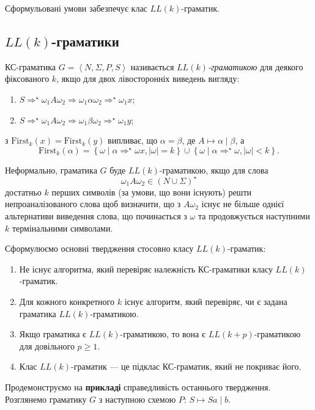 Сформульовані умови забезпечує клас $LL(k)$-граматик.

\subsection{\texorpdfstring{$LL(k)$}{LLk}-граматики}

КС-граматика $G = \left\langle N, \Sigma, P, S \right\rangle$ називається \textit{$LL(k)$-граматикою} для деякого фіксованого $k$, якщо для двох лівосторонніх виведень вигляду:
\begin{enumerate}
	\item $S \Rightarrow^\star \omega_1 A \omega_2 \Rightarrow \omega_1 \alpha \omega_2 \Rightarrow^\star \omega_1 x$;
	\item $S \Rightarrow^\star \omega_1 A \omega_2 \Rightarrow \omega_1 \beta \omega_2 \Rightarrow^\star \omega_1 y$;
\end{enumerate}
з $\text{First}_k (x) = \text{First}_k (y)$ випливає, що $\alpha = \beta$, де $A \mapsto \alpha \mid \beta$, а \[\text{First}_k(\alpha) = \left\{ \omega \mid \alpha \Rightarrow^\star \omega x,\vert\omega\vert = k \right\} \cup \left\{ \omega \mid \alpha \Rightarrow^\star \omega, \vert\omega\vert < k \right\}.\]

Неформально, граматика $G$ буде $LL(k)$-граматикою, якщо для слова \[\omega_1 A \omega_2 \in (N \cup \Sigma)^\star\] достатньо $k$ перших символів (за умови, що вони існують) решти непроаналізованого слова щоб визначити, що з $A \omega_2$ існує не більше однієї альтернативи виведення слова, що починається з $\omega$ та продовжується наступними $k$ термінальними символами. \medskip

Сформулюємо основні твердження стосовно класу $LL(k)$-граматик:
\begin{enumerate}
	\item Не існує алгоритма, який перевіряє належність КС-граматики класу $LL(k)$-граматик.
	\item Для кожного конкретного $k$ існує алгоритм, який перевіряє, чи є задана граматика $LL(k)$-граматикою.
	\item Якщо граматика є $LL(k)$-граматикою, то вона є $LL(k + p)$-гра\-ма\-ти\-ко\-ю для довільного $p \ge 1$.
	\item Клас $LL(k)$-граматик --- це підклас КС-граматик, який не покриває його.
\end{enumerate}

Продемонструємо на \textbf{прикладі} справедливість останнього твердження. Розглянемо граматику $G$ з наступною схемою $P$: $S \mapsto S a \mid b$. \medskip

